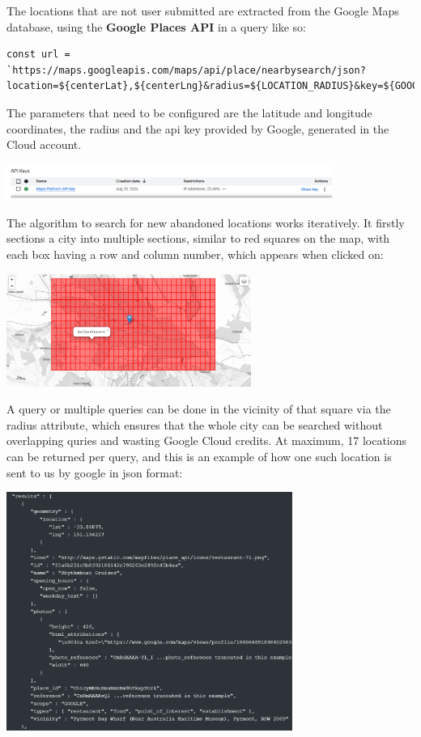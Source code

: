 \documentclass[12pt,a4paper]{report}
\begin{document}
The locations that are not user submitted are extracted from the Google Maps database, using the \textbf{Google Places API} in a query like so:

\begin{lstlisting}
const url = `https://maps.googleapis.com/maps/api/place/nearbysearch/json?location=${centerLat},${centerLng}&radius=${LOCATION_RADIUS}&key=${GOOGLE_MAPS_API_KEY}`;
\end{lstlisting}

The parameters that need to be configured are the latitude and longitude coordinates, the radius and the api key provided by Google, generated in the Cloud account.

\begin{center}
\includegraphics[width=0.8\textwidth]{images/google.png}
\end{center}

The algorithm to search for new abandoned locations works iteratively. It firstly sections a city into multiple sections, similar to red squares on the map, with each box having a row and column number, which appears when clicked on:

\begin{center}
\includegraphics[width=0.6\textwidth]{images/grid.png}
\end{center}

A query or multiple queries can be done in the vicinity of that square via the radius attribute, which ensures that the whole city can be searched without overlapping quries and wasting Google Cloud credits. At maximum, 17 locations can be returned per query, and this is an example of how one such location is sent to us by google in json format:

\begin{center}
\includegraphics[width=0.7\textwidth]{images/json.png}
\end{center}
\end{document}
